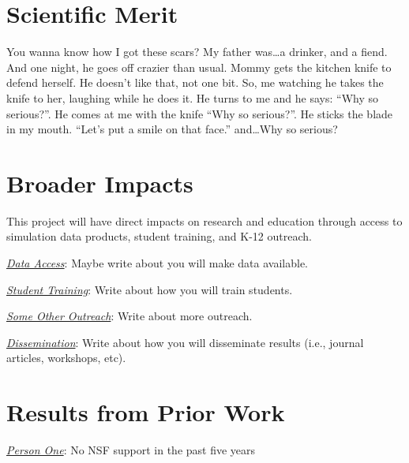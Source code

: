 \section{Scientific Merit}

You wanna know how I got these scars? My father was\ldots a drinker, and a fiend. And one night, he goes off crazier than usual. Mommy gets the kitchen knife to defend herself. He doesn't like that, not one bit. So, me watching he takes the knife to her, laughing while he does it. He turns to me and he says: ``Why so serious?''. He comes at me with the knife ``Why so serious?''. He sticks the blade in my mouth. ``Let's put a smile on that face.'' and\ldots Why so serious?


\section{Broader Impacts}
\label{broadimpacts}
\vspace*{-8pt}

This project will have direct impacts on research and education through access to simulation data products, student training, and K-12 outreach.  

\vspace{4pt}
\noindent \underline{\textit{Data Access}}: Maybe write about you will make data available.

\vspace{4pt}
\noindent \underline{\textit{Student Training}}: Write about how you will train students.

\vspace{4pt}
\noindent \underline{\textit{Some Other Outreach}}: Write about more outreach.

\vspace{4pt}
\noindent \underline{\textit{Dissemination}}: Write about how you will disseminate results (i.e., journal articles, workshops, etc).

\section{Results from Prior Work}

\noindent \emph{\underline{Person One}}: No NSF support in the past five years \newline

